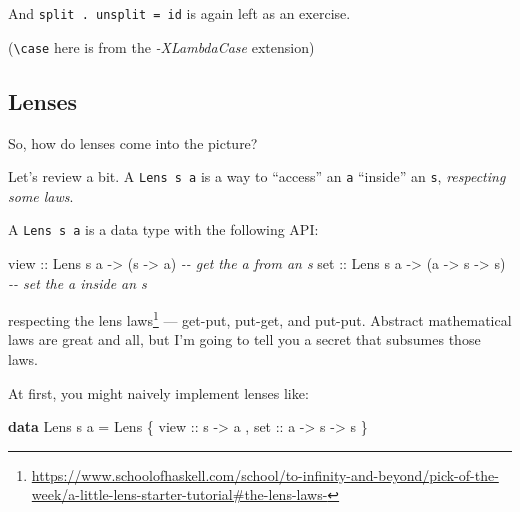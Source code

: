 \documentclass[]{article}
\newenvironment{Shaded}{}{}
\newcommand{\CommentTok}[1]{\textcolor[rgb]{0.38,0.63,0.69}{\textit{#1}}}
\newcommand{\DataTypeTok}[1]{\textcolor[rgb]{0.56,0.13,0.00}{#1}}
\newcommand{\KeywordTok}[1]{\textcolor[rgb]{0.00,0.44,0.13}{\textbf{#1}}}
\newcommand{\NormalTok}[1]{#1}
\newcommand{\OtherTok}[1]{\textcolor[rgb]{0.00,0.44,0.13}{#1}}
\renewcommand{\href}[2]{#2\footnote{\url{#1}}}
\begin{document}
And \texttt{split\ .\ unsplit\ =\ id} is again left as an exercise.

(\texttt{\textbackslash{}case} here is from the \emph{-XLambdaCase} extension)

\hypertarget{lenses}{%
\subsection{Lenses}\label{lenses}}

So, how do lenses come into the picture?

Let's review a bit. A \texttt{Lens\textquotesingle{}\ s\ a} is a way to
``access'' an \texttt{a} ``inside'' an \texttt{s}, \emph{respecting some laws}.

A \texttt{Lens\textquotesingle{}\ s\ a} is a data type with the following API:

\begin{Shaded}
\begin{Highlighting}[]
\OtherTok{view ::} \DataTypeTok{Lens\textquotesingle{}}\NormalTok{ s a }\OtherTok{{-}>}\NormalTok{ (s }\OtherTok{{-}>}\NormalTok{ a)                }\CommentTok{{-}{-} get the \textquotesingle{}a\textquotesingle{} from an \textquotesingle{}s\textquotesingle{}}
\OtherTok{set  ::} \DataTypeTok{Lens\textquotesingle{}}\NormalTok{ s a }\OtherTok{{-}>}\NormalTok{ (a }\OtherTok{{-}>}\NormalTok{ s }\OtherTok{{-}>}\NormalTok{ s)           }\CommentTok{{-}{-} set the \textquotesingle{}a\textquotesingle{} inside an \textquotesingle{}s\textquotesingle{}}
\end{Highlighting}
\end{Shaded}

respecting
\href{https://www.schoolofhaskell.com/school/to-infinity-and-beyond/pick-of-the-week/a-little-lens-starter-tutorial\#the-lens-laws-}{the
lens laws} --- get-put, put-get, and put-put. Abstract mathematical laws are
great and all, but I'm going to tell you a secret that subsumes those laws.

At first, you might naively implement lenses like:

\begin{Shaded}
\begin{Highlighting}[]
\KeywordTok{data} \DataTypeTok{Lens\textquotesingle{}}\NormalTok{ s a }\OtherTok{=} \DataTypeTok{Lens\textquotesingle{}}
\NormalTok{    \{}\OtherTok{ view ::}\NormalTok{ s }\OtherTok{{-}>}\NormalTok{ a}
\NormalTok{    ,}\OtherTok{ set  ::}\NormalTok{ a }\OtherTok{{-}>}\NormalTok{ s }\OtherTok{{-}>}\NormalTok{ s}
\NormalTok{    \}}
\end{Highlighting}
\end{Shaded}
\end{document}
